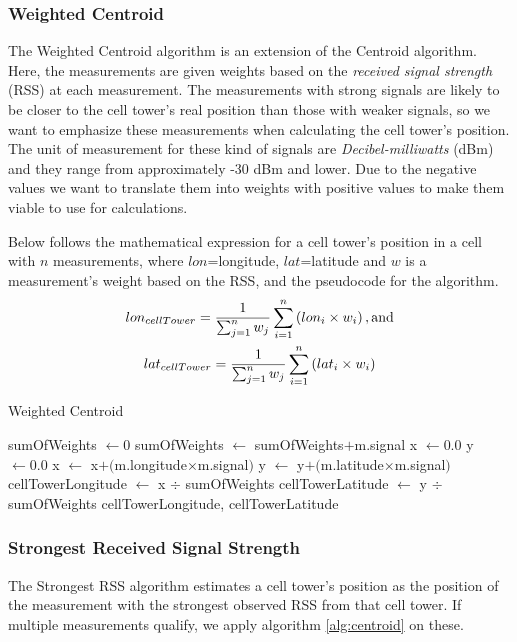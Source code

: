 \documentclass[a4paper, 12pt]{article}
\begin{document}
\subsubsection{Weighted Centroid}
The Weighted Centroid algorithm is an extension of the Centroid algorithm. Here, the measurements are given weights based on the \textit{received signal strength} (RSS) at each measurement. The measurements with strong signals are likely to be closer to the cell tower's real position than those with weaker signals, so we want to emphasize these measurements when calculating the cell tower's position. The unit of measurement for these kind of signals are \textit{Decibel-milliwatts} (dBm) and they range from approximately -30 dBm and lower. Due to the negative values we want to translate them into weights with positive values to make them viable to use for calculations.

Below follows the mathematical expression for a cell tower's position in a cell with $n$ measurements, where $lon$=longitude, $lat$=latitude and $w$ is a measurement's weight based on the RSS, and the pseudocode for the algorithm.
\begin{gather*}
lon_{cellTower} = \frac{1}{\sum^{n}_{j=1}w_j}\sum^{n}_{i=1}\left(lon_i \times w_i\right), \textnormal{and}\\
lat_{cellTower} = \frac{1}{\sum^{n}_{j=1}w_j}\sum^{n}_{i=1}\left(lat_i \times w_i\right)
\end{gather*}

\begin{algorithm}
\caption{Weighted Centroid}
\label{alg:weightedcentroid}
\begin{algorithmic}[1]
\State sumOfWeights $\gets 0$
\State sumOfWeights $\gets$ sumOfWeights$+$m.signal 
\EndFor
\State x $\gets 0.0$
\State y $\gets 0.0$
\State x $\gets$ x$+($m.longitude$\times$m.signal$)$
\State y $\gets$ y$+($m.latitude$\times$m.signal$)$
\EndFor
\State cellTowerLongitude $\gets$ x $\div$ sumOfWeights
\State cellTowerLatitude $\gets$ y $\div$ sumOfWeights
\State \Return cellTowerLongitude, cellTowerLatitude
\EndProcedure
\end{algorithmic}
\end{algorithm}

\subsubsection{Strongest Received Signal Strength}
The Strongest RSS algorithm estimates a cell tower's position as the position of the measurement with the strongest observed RSS from that cell tower. If multiple measurements qualify, we apply algorithm \ref{alg:centroid} on these.
\end{document}
